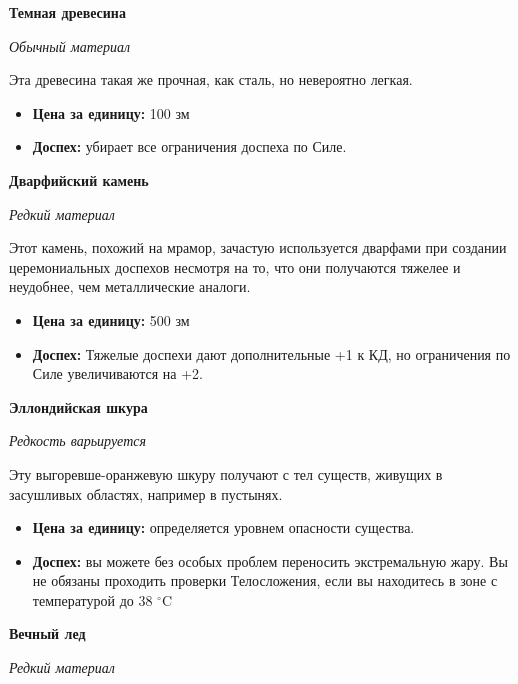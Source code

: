 \documentclass[a4paper, 9pt, twocolumn]{book}
\begin{document}
	\noindent \textbf{Темная древесина}
	
	\noindent \textit{Обычный материал}
	
	\smallskip
	
	Эта древесина такая же прочная, как сталь, но невероятно легкая.
	
	\begin{itemize}
		\item \textbf{Цена за единицу:} 100 зм
		
		\item \textbf{Доспех:} убирает все ограничения доспеха по Силе.
	\end{itemize}

	\noindent \textbf{Дварфийский камень}
	
	\noindent \textit{Редкий материал}
	
	\smallskip
	
	\noindent Этот камень, похожий на мрамор, зачастую используется дварфами при создании церемониальных доспехов несмотря на то, что они получаются тяжелее и неудобнее, чем металлические аналоги.
	
	\begin{itemize}
		\item \textbf{Цена за единицу:} 500 зм
		
		\item \textbf{Доспех:} Тяжелые доспехи дают дополнительные +1 к КД, но ограничения по Силе увеличиваются на +2.
	\end{itemize}

	\noindent \textbf{Эллондийская шкура}
	
	\noindent \textit{Редкость варьируется}
	
	\smallskip
	
	\noindent Эту выгоревше-оранжевую шкуру получают с тел существ, живущих в засушливых областях, например в пустынях.
	
	\begin{itemize}
		\item \textbf{Цена за единицу:} определяется уровнем опасности существа.
		
		\item \textbf{Доспех:} вы можете без особых проблем переносить экстремальную жару. Вы не обязаны проходить проверки Телосложения, если вы находитесь в зоне с температурой до 38 $^\circ$C
	\end{itemize}

	\noindent \textbf{Вечный лед}
	
	\noindent \textit{Редкий материал}
	
\end{document}
